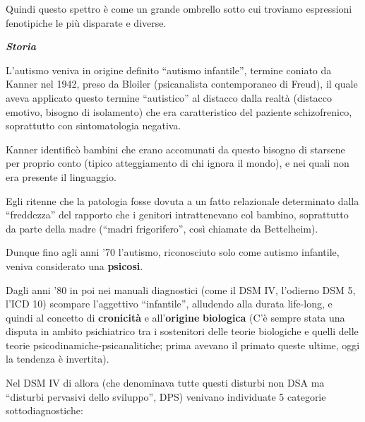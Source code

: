 \documentclass[]{article}
\begin{document}
Quindi questo spettro è come un grande ombrello sotto cui troviamo
espressioni fenotipiche le più disparate e diverse.

\emph{\textbf{Storia}}

L'autismo veniva in origine definito ``autismo infantile'', termine
coniato da Kanner nel 1942, preso da Bloiler (psicanalista contemporaneo
di Freud), il quale aveva applicato questo termine ``autistico'' al
distacco dalla realtà (distacco emotivo, bisogno di isolamento) che era
caratteristico del paziente schizofrenico, soprattutto con
sintomatologia negativa.

Kanner identificò bambini che erano accomunati da questo bisogno di
starsene per proprio conto (tipico atteggiamento di chi ignora il
mondo), e nei quali non era presente il linguaggio.

Egli ritenne che la patologia fosse dovuta a un fatto relazionale
determinato dalla ``freddezza'' del rapporto che i genitori
intrattenevano col bambino, soprattutto da parte della madre (``madri
frigorifero'', così chiamate da Bettelheim).

Dunque fino agli anni '70 l'autismo, riconosciuto solo come autismo
infantile, veniva considerato una \textbf{psicosi}.

Dagli anni '80 in poi nei manuali diagnostici (come il DSM IV, l'odierno
DSM 5, l'ICD 10) scompare l'aggettivo ``infantile'', alludendo alla
durata life-long, e quindi al concetto di \textbf{cronicità} e
all'\textbf{origine} \textbf{biologica} (C'è sempre stata una disputa in
ambito psichiatrico tra i sostenitori delle teorie biologiche e quelli
delle teorie psicodinamiche-psicanalitiche; prima avevano il primato
queste ultime, oggi la tendenza è invertita).

Nel DSM IV di allora (che denominava tutte questi disturbi non DSA ma
``disturbi pervasivi dello sviluppo'', DPS) venivano individuate 5
categorie sottodiagnostiche:
\end{document}
